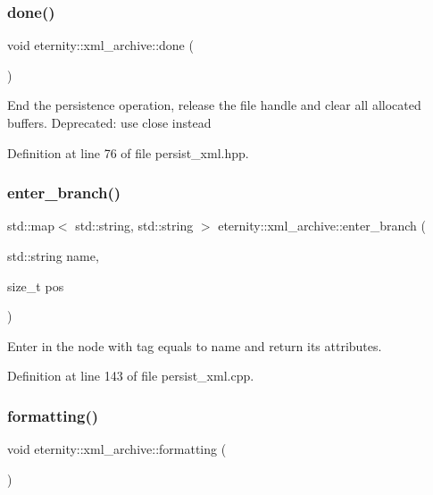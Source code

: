 \subsubsection{\texorpdfstring{done()}{done()}}
{\footnotesize\ttfamily void eternity\+::xml\+\_\+archive\+::done (\begin{DoxyParamCaption}{ }\end{DoxyParamCaption})\hspace{0.3cm}{\ttfamily [inline]}}

End the persistence operation, release the file handle and clear all allocated buffers. Deprecated\+: use close instead 

Definition at line 76 of file persist\+\_\+xml.\+hpp.

\mbox{\label{classeternity_1_1xml__archive_a58b5909bfe2c5aba094633f5f38f850a}} 
\subsubsection{\texorpdfstring{enter\+\_\+branch()}{enter\_branch()}}
{\footnotesize\ttfamily std\+::map$<$ std\+::string, std\+::string $>$ eternity\+::xml\+\_\+archive\+::enter\+\_\+branch (\begin{DoxyParamCaption}\item[{std\+::string}]{name,  }\item[{size\+\_\+t}]{pos }\end{DoxyParamCaption})}



Enter in the node with tag equals to name and return its attributes. 



Definition at line 143 of file persist\+\_\+xml.\+cpp.

\mbox{\label{classeternity_1_1xml__archive_a53816e7723e949920db15981b91fc3c1}} 
\subsubsection{\texorpdfstring{formatting()}{formatting()}}
{\footnotesize\ttfamily void eternity\+::xml\+\_\+archive\+::formatting (\begin{DoxyParamCaption}{ }\end{DoxyParamCaption})}



